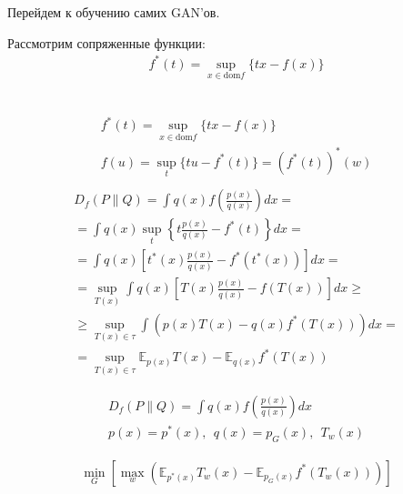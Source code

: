 \documentclass{book}
\begin{document}
Перейдем к обучению самих GAN'ов.

Рассмотрим сопряженные функции:
\begin{gather*}
    f^*(t)=\sup_{x\in \mathrm{dom} f} \{tx-f(x)\}
\end{gather*}

    \\

    \begin{gather*}
    f^*(t)=\sup_{x\in \mathrm{dom} f} \{tx-f(x)\}\\
    f(u)=\sup_t \{tu-f^*(t)\}=(f^*(t))^*(w)\\
    \end{gather*}
    \begin{gather*}
        D_f(P\|Q)=\int {q(x)f\left(\frac{p(x)}{q(x)}\right)dx}=\\
        =\int {q(x)\sup_t\left\{t\frac{p(x)}{q(x)}-f^*(t)\right\}dx}=\\
        =\int {q(x)\left[t^*(x)\frac{p(x)}{q(x)}-f^*(t^*(x))\right]dx}=\\
        =\sup_{T(x)}\int {q(x)\left[T(x)\frac{p(x)}{q(x)}-f(T(x))\right]dx}\geq\\
        \geq \sup_{T(x)\in \tau}\int {(p(x)T(x)-q(x)f^*(T(x)))dx}=\\
        =\sup_{T(x)\in\tau} \mathbb{E}_{p(x)}T(x)-\mathbb{E}_{q(x)}f^*(T(x))
    \end{gather*}

    \begin{gather*}
        D_f(P\|Q)=\int {q(x)f\left(\frac{p(x)}{q(x)}\right)dx}\\
        p(x)=p^*(x),~~ q(x) = p_G(x),~~ T_w(x)
    \end{gather*}

    \begin{gather*}
        \min_G\left[\max_w\left(\mathbb{E}_{p^*(x)}T_w(x)-\mathbb{E}_{p_G(x)}f^*(T_w(x))\right)\right]
    \end{gather*}
\end{document}
